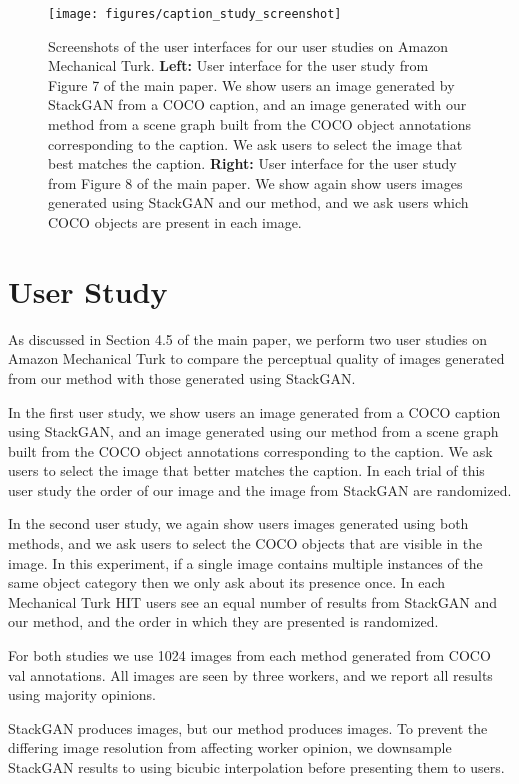 \documentclass[10pt,twocolumn,letterpaper]{article}
\begin{document}
 
\begin{figure*}
  \centering
  \texttt{[image: figures/caption\_study\_screenshot]}
  \caption{
    Screenshots of the user interfaces for our user studies on Amazon Mechanical Turk.
    \textbf{Left:} User interface for the user study from Figure 7 of the main paper.
    We show users an image generated by StackGAN from a COCO caption, and an image 
    generated with our method from a scene graph built from the COCO object annotations
    corresponding to the caption. We ask users to select the image that best matches
    the caption.
    \textbf{Right:} User interface for the user study from Figure 8 of the main paper.
    We show again show users images generated using StackGAN and our method, and we
    ask users which COCO objects are present in each image.
  }
  \label{fig:user-study-ui}
\end{figure*}

\section{User Study}
As discussed in Section 4.5 of the main paper, we perform two user studies on Amazon
Mechanical Turk to compare the perceptual quality of images generated from our method
with those generated using StackGAN.

In the first user study, we show users an image generated from a COCO caption using
StackGAN, and an image generated using our method from a scene graph built from the
COCO object annotations corresponding to the caption. We ask users to select the image that
better matches the caption. In each trial of this user study the order of our image and the
image from StackGAN are randomized.

In the second user study, we again show users images generated using both methods,
and we ask users to select the COCO objects that are visible in the image.
In this experiment, if a single image contains multiple instances of the same object
category then we only ask about its presence once. In each Mechanical Turk HIT users
see an equal number of results from StackGAN and our method, and the order in which
they are presented is randomized.

For both studies we use 1024 images from each method generated from COCO val annotations.
All images are seen by three workers, and we report all results using majority opinions.

StackGAN produces  images, but our method produces  images.
To prevent the differing image resolution from affecting worker opinion, we downsample
StackGAN results to  using bicubic interpolation before presenting them to
users.
 \clearpage
\end{document}
